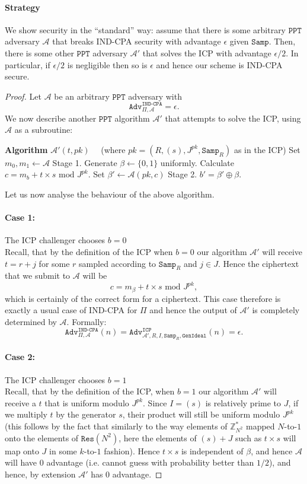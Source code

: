 \documentclass{article}
\theoremstyle{definition}
\theoremstyle{example}
\newcommand{\A}{\mathcal{A}}
\newcommand{\Int}{\mathbb{Z}}
\newcommand{\PPT}{\texttt{PPT}}
\renewcommand{\mod}{\,\,\text{mod}\,\,}
\newcommand{\Adv}[2]{\texttt{Adv}^{\texttt{#1}}_{#2}}
\newcommand{\GenIdeal}{\texttt{GenIdeal}}
\newcommand{\Samp}{\texttt{Samp}}
\begin{document}
\paragraph{Strategy}  We show security in the ``standard'' way: assume that there is some arbitrary
  $\PPT$ adversary $\A$ that breaks IND-CPA security with advantage $\epsilon$ given
  $\Samp$. Then, there is some other $\PPT$ adversary $\A'$ that solves the ICP
  with advantage $\epsilon/2$. In particular, if $\epsilon/2$ is
  negligible then so is $\epsilon$ and hence our scheme is IND-CPA secure.
\begin{proof}
  Let $\A$ be an arbitrary $\PPT$ adversary with
  \[
    \Adv{IND-CPA}{\Pi, \A} = \epsilon.
  \]
  We now describe another $\PPT$ algorithm $\A'$ that attempts to solve the ICP,
  using $\A$ as a subroutine:\\
  \begin{algorithmic}
    \State \textbf{Algorithm} $\A'(t, pk)\quad$ (where $pk = (R, (s), J^{pk},
    \Samp_R)$ as in the ICP)
    \State Set $m_0, m_1 \leftarrow \A$ Stage 1.
    \State Generate $\beta \leftarrow \{0, 1\}$ uniformly.
    \State Calculate $c = m_b + t \times s \mod J^{pk}$.
    \State Set $\beta' \leftarrow \A(pk, c)$ Stage 2.
    \State \Return $b' = \beta' \oplus \beta$.
    \State
  \end{algorithmic}
  Let us now analyse the behaviour of the above algorithm.
  \paragraph{Case 1:} The ICP challenger chooses $b = 0$\\ 
  Recall, that by the definition of the ICP when $b = 0$ our algorithm $\A'$ will
  receive $t = r + j$ for some $r$ sampled according to $\Samp_R$ and $j \in J$.
  Hence the ciphertext that we submit to $\A$ will be
  \[
    c = m_\beta + t \times s \mod J^{pk},
  \]
  which is certainly of the correct form for a ciphertext. This case therefore
  is exactly a usual case of IND-CPA for $\Pi$ and hence the output of
  $\A'$ is completely determined by $\A$. Formally:
  \[
    \Adv{IND-CPA}{\Pi, \A}(n) = \Adv{ICP}{\A', R, I, \Samp_R, \GenIdeal}(n) = \epsilon.
  \]
  \paragraph{Case 2:} The ICP challenger chooses $b = 1$\\ 
  Recall, that by the definition of the ICP, when $b = 1$ our algorithm $\A'$
  will receive a $t$ that is uniform modulo $J^{pk}$. Since $I = (s)$ is
  relatively prime to $J$, if we multiply $t$ by the generator $s$, their
  product will still be uniform modulo $J^{pk}$ (this follows by the fact that
  similarly to the way elements of $\Int_{N^2}^*$ mapped $N$-to-$1$ onto the
  elements of $\texttt{Res}(N^2)$, here the elements of $(s) + J$ such as
  $t \times s$ will map onto $J$ in some $k$-to-$1$ fashion). Hence $t\times s$
  is independent of $\beta$, and hence $\A$ will have 0 advantage (i.e. cannot
  guess with probability better than $1/2$), and hence, by extension $\A'$ has 0
  advantage.

\end{proof}
\end{document}
